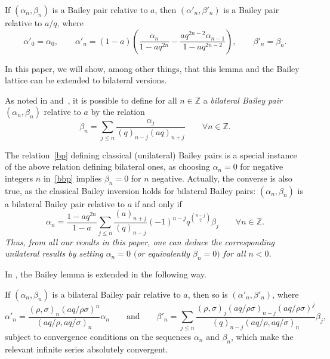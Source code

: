 \begin{Lemma}[McLaughlin]
\label{lem:Mac}
If $(\alpha_n, \beta_n)$ is a Bailey pair relative to $a$, then $(\alpha'_n, \beta'_n)$ is a Bailey pair relative to $a/q$, where
\begin{equation*}
\alpha'_0=\alpha_0, \qquad \alpha'_n=(1-a)\left(\frac{\alpha_n}{1-aq^{2n}}-\frac{aq^{2n-2}\alpha_{n-1}}{1-aq^{2n-2}}\right), \qquad \beta'_n=\beta_n.
\end{equation*}
\end{Lemma}

In this paper, we will show, among other things, that this lemma and the Bailey lattice can be extended to bilateral versions.


As noted in \cite{BMS} and~\cite{J}, it is possible to define for all $n\in\mathbb{Z}$ a \emph{bilateral Bailey pair} $(\alpha_n, \beta_n)$ relative to $a$ by the relation
\begin{equation}\label{bbp}
\beta_n=\sum_{j\leq n}\frac{\alpha_j}{(q)_{n-j}(aq)_{n+j}}\qquad\forall n\in\mathbb{Z}.
\end{equation}

\begin{Remark}\label{rk:bilatinversion}
The relation~\eqref{bp} defining classical (unilateral) Bailey pairs is a special instance of the above relation defining bilateral ones, as choosing $\alpha_n=0$ for negative integers $n$ in~\eqref{bbp} implies $\beta_n=0$ for $n$ negative. Actually, the converse is also true, as the classical Bailey inversion holds for bilateral Bailey pairs: $(\alpha_n, \beta_n)$ is a bilateral Bailey pair relative to $a$ if and only if
\begin{equation}\label{bilatinversion}
\alpha_n=\frac{1-aq^{2n}}{1-a}\sum_{j\leq n}\frac{(a)_{n+j}}{(q)_{n-j}}(-1)^{n-j}q^{\binom{n-j}{2}}\beta_j\qquad\forall n\in\mathbb{Z}.
\end{equation}
\textit{Thus, from all our results in this paper, one can deduce the corresponding unilateral results by setting $\alpha_n=0$ $($or equivalently $\beta_n=0)$ for all $n<0$.}
\end{Remark}

In \cite{BMS}, the Bailey lemma is extended in the following way.
\begin{Theorem}\label{thm:bilatbaileylemma}
If $(\alpha_n, \beta_n)$ is a bilateral Bailey pair relative to $a$, then
so is $(\alpha'_n, \beta'_n)$, where
\begin{equation*}\alpha'_n=\frac{(\rho,\sigma)_n(aq/\rho\sigma)^n}{
(aq/\rho,aq/\sigma)_n}\alpha_n\qquad\mbox{and}\qquad\beta'_n=\sum_{j\leq n}\frac{(\rho,\sigma)_j(aq/\rho\sigma)_{n-j}(aq/\rho\sigma)^j}{(q)_{n-j}(aq/\rho,aq/\sigma)_n}\beta_j,
\end{equation*}
subject to convergence conditions on the sequences $\alpha_n$ and $\beta_n$, which make the relevant infinite series absolutely convergent.
\end{Theorem}

